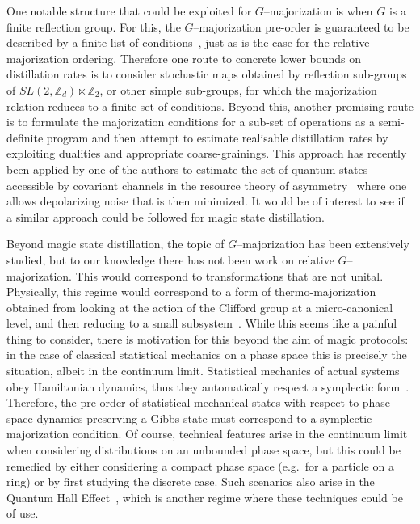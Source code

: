 \documentclass[
onecolumn,
superscriptaddress
]{revtex4-1}
\begin{document}
One notable structure that could be exploited for $G$--majorization is when $G$ is a finite reflection group. For this,  the $G$--majorization pre-order is guaranteed to be described by a finite list of conditions~\cite{giovagnoli_1985}, just as is the case for the relative majorization ordering. Therefore one route to concrete lower bounds on distillation rates is to consider stochastic maps obtained by reflection sub-groups of $SL(2,\mathbb{Z}_d) \ltimes \mathbb{Z}_2$, or other simple sub-groups, for which the majorization relation reduces to a finite set of conditions. Beyond this, another promising route is to formulate the majorization conditions for a sub-set of operations as a semi-definite program and then attempt to estimate realisable distillation rates by exploiting dualities and appropriate coarse-grainings. This approach has recently been applied by one of the authors to estimate the set of quantum states accessible by covariant channels in the resource theory of asymmetry~\cite{alexander2021} where one allows depolarizing noise that is then minimized. 
It would be of interest to see if a similar approach could be followed for magic state distillation.
 
Beyond magic state distillation, the topic of $G$--majorization has been extensively studied, but to our knowledge there has not been work on relative $G$--majorization. This would correspond to transformations that are not unital. Physically, this regime would correspond to a form of thermo-majorization obtained from looking at the action of the Clifford group at a micro-canonical level, and then reducing to a small subsystem~\cite{Pathria_1997}. While this seems like a painful thing to consider, there is motivation for this beyond the aim of magic protocols: in the case of classical statistical mechanics on a phase space this is precisely the situation, albeit in the continuum limit. Statistical mechanics of actual systems obey Hamiltonian dynamics, thus they automatically respect a symplectic form~\cite{Arnold_2000, Pathria_1997}. Therefore, the pre-order of statistical mechanical states with respect to phase space dynamics preserving a Gibbs state must correspond to a symplectic majorization condition. Of course, technical features arise in the continuum limit when considering distributions on an unbounded phase space, but this could be remedied by either considering a compact phase space (e.g.~for a particle on a ring) or by first studying the discrete case. Such scenarios also arise in the Quantum Hall Effect~\cite{Klitzing_1980}, which is another regime where these techniques could be of use.
\end{document}
